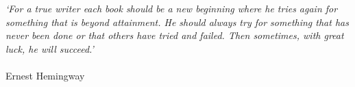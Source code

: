 \cleardoublepage



\vspace*{4mm}
\emph{`For a true writer each book should be a new beginning where he tries again for something that is beyond attainment. He should always try for something that has never been done or that others have tried and failed. Then sometimes, with great luck, he will succeed.'}\\
\\



\hfill \hfill Ernest Hemingway